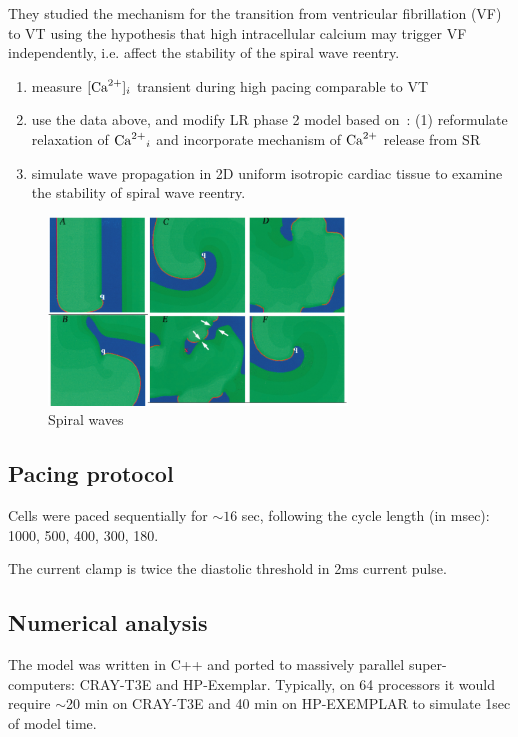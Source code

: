 They studied the mechanism for the transition from
ventricular fibrillation (VF) to VT using the hypothesis that high intracellular
calcium may trigger VF independently, i.e. affect the stability of the
spiral wave reentry.
\begin{enumerate}
\item measure $[{\text{Ca}^{2+}}]_i$ transient during high pacing comparable to VT

\item use the data above, and modify LR phase 2 model based
  on~\citep{luo1994dmc_a, zeng1995}: (1) reformulate relaxation of
  ${\text{Ca}^{2+}}_i$ and incorporate mechanism of ${\text{Ca}^{2+}}$ release from SR

\item simulate wave propagation in 2D uniform isotropic cardiac tissue
  to examine the stability of spiral wave reentry.
\end{enumerate}

\begin{figure}[hbt]
  \centerline{\includegraphics[height=5cm]{./images/Chudin_spiralwave.eps}}
\caption{Spiral waves}
\label{fig:Chudin_spiral}
\end{figure}



\subsection{Pacing protocol}
\label{sec:pacing-protocol}

Cells were paced sequentially for $\sim 16$ sec, following the cycle
length (in msec): 1000, 500, 400, 300, 180. 

The current clamp is twice the diastolic threshold in 2ms current
pulse. 

\subsection{Numerical analysis}
\label{sec:numerical-analysis-1}

The model was written in C++ and ported to massively parallel super-
computers: CRAY-T3E and HP-Exemplar. Typically, on 64 processors it
would require $\sim$20 min on CRAY-T3E and 40 min on HP-EXEMPLAR to
simulate 1sec of model time. 


